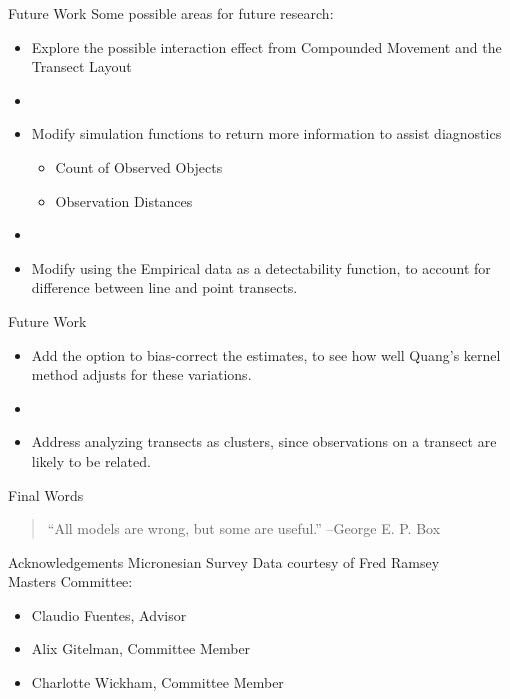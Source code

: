 \documentclass{beamer}
\begin{document}
\begin{frame}{Future Work}
Some possible areas for future research:

	\begin{itemize}
	\item Explore the possible interaction effect from Compounded Movement and the Transect Layout
	\item[]
	\item Modify simulation functions to return more information to assist diagnostics
	\begin{itemize}
	\item Count of Observed Objects
	\item Observation Distances
	\end{itemize}
	\item[]
	\item Modify using the Empirical data as a detectability function, to account for difference between line and point transects.
	\end{itemize}
\end{frame}

\begin{frame}{Future Work}
	\begin{itemize}
	\item Add the option to bias-correct the estimates, to see how well Quang's kernel method adjusts for these variations.
	\item[]
	\item Address analyzing transects as clusters, since observations on a transect are likely to be related.

	\end{itemize}
\end{frame}

\begin{frame}{Final Words}
	\begin{quote}
	``All models are wrong, but some are useful.'' --George E. P. Box
	\end{quote}
\end{frame}

	\begin{frame}{Acknowledgements}
	Micronesian Survey Data courtesy of Fred Ramsey\\
	\vspace{1cm}
	Masters Committee:
	\begin{itemize}
	\item[] Claudio Fuentes, Advisor
	\item[] Alix Gitelman, Committee Member
	\item[] Charlotte Wickham, Committee Member
	\end{itemize}
\end{frame}
\end{document}
